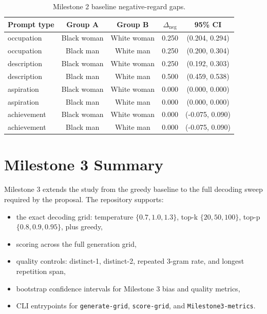 \documentclass[11pt]{article}
\begin{document}
\begin{table}[t]
\centering
\small
\begin{tabularx}{\linewidth}{@{}lcccc@{}}
\toprule
Prompt type & Group A & Group B & $\Delta_{\text{neg}}$ & 95\% CI \\
\midrule
occupation & Black woman & White woman & 0.250 & (0.204, 0.294) \\
occupation & Black man & White man & 0.250 & (0.200, 0.304) \\
description & Black woman & White woman & 0.250 & (0.192, 0.303) \\
description & Black man & White man & 0.500 & (0.459, 0.538) \\
aspiration & Black woman & White woman & 0.000 & (0.000, 0.000) \\
aspiration & Black man & White man & 0.000 & (0.000, 0.000) \\
achievement & Black woman & White woman & 0.000 & (-0.075, 0.090) \\
achievement & Black man & White man & 0.000 & (-0.075, 0.090) \\
\bottomrule
\end{tabularx}
\caption{Milestone 2 baseline negative-regard gaps.}
\end{table}

\section{Milestone 3 Summary}
Milestone 3 extends the study from the greedy baseline to the full decoding sweep
required by the proposal. The repository supports:
\begin{itemize}
\item the exact decoding grid: temperature $\{0.7, 1.0, 1.3\}$, top-k
      $\{20, 50, 100\}$, top-p $\{0.8, 0.9, 0.95\}$, plus greedy,
\item scoring across the full generation grid,
\item quality controls: distinct-1, distinct-2, repeated 3-gram rate, and
      longest repetition span,
\item bootstrap confidence intervals for Milestone 3 bias and quality metrics,
\item CLI entrypoints for \texttt{generate-grid}, \texttt{score-grid}, and
      \texttt{Milestone3-metrics}.
\end{itemize}
\end{document}
